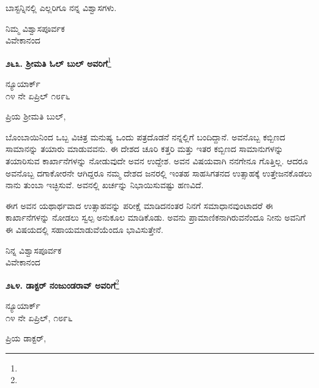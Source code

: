 ಬಾಸ್ಟನ್ನಿನಲ್ಲಿ ಎಲ್ಲರಿಗೂ ನನ್ನ ವಿಶ್ವಾಸಗಳು.

{\flushright
ನಿಮ್ಮ ವಿಶ್ವಾಸಪೂರ್ವಕ\\ವಿವೇಕಾನಂದ\par}

\begin{center}
\textbf{೨೬೩. ಶ‍್ರೀಮತಿ ಓಲ್ ಬುಲ್ ಅವರಿಗೆ}\footnote{}
\end{center}

\begin{flushright}
ನ್ಯೂಯಾರ್ಕ್\\೧೪ ನೇ ಏಪ್ರಿಲ್ ೧೮೯೬
\end{flushright}

\noindent
ಪ್ರಿಯ ಶ‍್ರೀಮತಿ ಬುಲ್,

ಬೊಂಬಾಯಿನಿಂದ ಒಬ್ಬ ವಿಚಿತ್ರ ಮನುಷ್ಯ ಒಂದು ಪತ್ರದೊಡನೆ ನನ್ನಲ್ಲಿಗೆ ಬಂದಿ\-ದ್ದಾನೆ. ಅವನೊಬ್ಬ ಕಬ್ಬಿಣದ ಸಾಮಾನನ್ನು ತಯಾರು ಮಾಡುವವನು. ಈ ದೇಶದ ಚೂರಿ ಕತ್ತರಿ ಮತ್ತು ಇತರ ಕಬ್ಬಿಣದ ಸಾಮಾನುಗಳನ್ನು ತಯಾರಿಸುವ ಕಾರ್ಖಾನೆಗಳನ್ನು ನೋಡುವುದೇ ಅವನ ಉದ್ದೇಶ. ಅವನ ವಿಷಯವಾಗಿ ನನಗೇನೂ ಗೊತ್ತಿಲ್ಲ. ಆದರೂ ಅವನೊಬ್ಬ ದಗಾಕೋರನೇ ಆಗಿದ್ದರೂ ನಮ್ಮ ದೇಶದ ಜನರಲ್ಲಿ ಇಂತಹ ಸಾಹಸಿಗತನದ ಉತ್ಸಾಹಕ್ಕೆ ಉತ್ತೇಜನಕೊಡಲು ನಾನು ತುಂಬಾ ಇಚ್ಛಿಸುವೆ. ಅವನಲ್ಲಿ ಖರ್ಚನ್ನು ನಿಭಾಯಿಸುವಷ್ಟು ಹಣವಿದೆ.

ಈಗ ಅವನ ಯಥಾರ್ಥವಾದ ಉತ್ಸಾಹವನ್ನು ಪರೀಕ್ಷೆ ಮಾಡಿದನಂತರ ನಿನಗೆ ಸಮಾಧಾನವುಂಟಾದರೆ ಈ ಕಾರ್ಖಾನೆಗಳನ್ನು ನೋಡಲು ಸ್ವಲ್ಪ ಅನುಕೂಲ ಮಾಡಿಕೊಡು. ಅವನು ಪ್ರಾಮಾಣಿಕನಾಗಿರುವನೆಂದೂ ನೀನು ಅವನಿಗೆ ಈ ವಿಷಯದಲ್ಲಿ ಸಹಾಯಮಾಡುವೆಯೆಂದೂ ಭಾವಿಸುತ್ತೇನೆ.

{\flushright
ನಿನ್ನ ವಿಶ್ವಾಸಪೂರ್ವಕ\\ವಿವೇಕಾನಂದ\par}

\begin{center}
\textbf{೨೬೪. ಡಾಕ್ಟರ್‌ ನಂಜುಂಡರಾವ್ ಅವರಿಗೆ}\footnote{}
\end{center}

\begin{flushright}
ನ್ಯೂಯಾರ್ಕ್\\೧೪ ನೇ ಏಪ್ರಿಲ್, ೧೮೯೬
\end{flushright}

\noindent
ಪ್ರಿಯ ಡಾಕ್ಟರ್,

